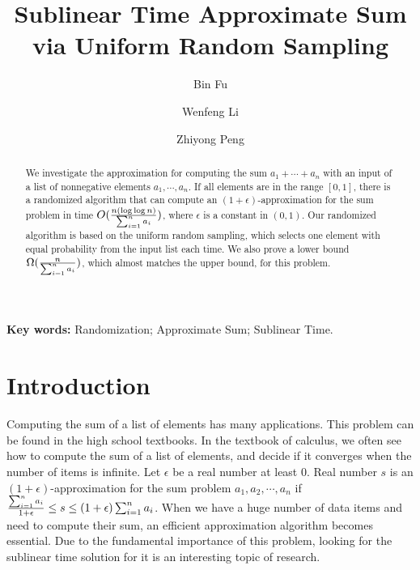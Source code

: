 \documentclass[runningheads]{llncs}
\newcommand{\timecomplexity}{O({n(\log\log n)\over \sum_{i=1}^n a_i})}
\begin{document}
\date{}


\title{Sublinear Time Approximate Sum via Uniform Random Sampling}
\author{Bin Fu\and Wenfeng Li \and Zhiyong Peng}
  \maketitle






\begin{abstract} We investigate the approximation for computing
the sum $a_1+\cdots +a_n$ with  an input of a list of nonnegative
elements $a_1,\cdots, a_n$. If all elements are in the range
$[0,1]$, there is a randomized algorithm that can compute an
$(1+\epsilon)$-approximation for the sum problem in time
$\timecomplexity$, where $\epsilon$ is a constant in $(0,1)$. Our
randomized algorithm is based on the uniform random sampling, which
selects one element with equal probability from the input list each
time. We also prove a lower bound $\Omega({n\over \sum_{i=1}^n
a_i})$, which almost matches the upper bound, for this problem.
\end{abstract}



\centerline {{\bf Key words:}  Randomization;   Approximate Sum;
Sublinear Time.}

\section{Introduction}

Computing the sum of a list of elements has many applications. This
problem can be found in the high school textbooks. In the textbook
of calculus, we often see how to compute the sum of a list of
elements, and decide if it converges when the number of items is
infinite. Let $\epsilon$ be a real number at least  $0$. Real number
$s$ is an $(1+\epsilon)$-approximation for the sum problem
$a_1,a_2,\cdots, a_n$ if ${\sum_{i=1}^n a_i\over 1+\epsilon}\le s\le
(1+\epsilon)\sum_{i=1}^na_i$. When we have a huge number of data
items and need to compute their sum, an efficient approximation
algorithm becomes essential. Due to the fundamental importance of
this problem, looking for the sublinear time solution for it is an
interesting topic of research.
\end{document}

